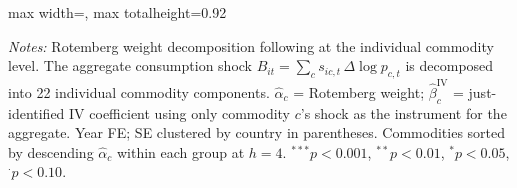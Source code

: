 \begin{table}[htbp]
\begin{adjustbox}{max width=\textwidth, max totalheight=0.92\textheight}
\begin{threeparttable}
\begin{tablenotes}\small
\item \textit{Notes:} Rotemberg weight decomposition following \citet{GoldsmithPinkham2020} at the individual commodity level. The aggregate consumption shock $B_{it} = \sum_c s_{ic,t}\,\Delta\log p_{c,t}$ is decomposed into 22 individual commodity components. $\hat{\alpha}_c$ = Rotemberg weight; $\hat{\beta}_c^{\text{IV}}$ = just-identified IV coefficient using only commodity $c$'s shock as the instrument for the aggregate. Year FE; SE clustered by country in parentheses. Commodities sorted by descending $\hat{\alpha}_c$ within each group at $h=4$. $^{***}p<0.001$, $^{**}p<0.01$, $^{*}p<0.05$, $^{\cdot}p<0.10$.
\end{tablenotes}
\end{threeparttable}
\end{adjustbox}
\end{table}
